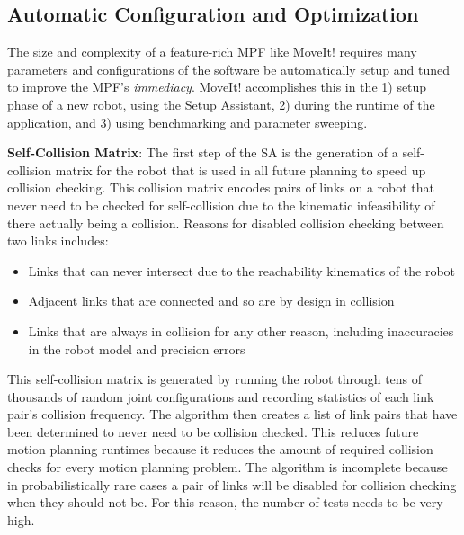 \documentclass[10pt,journal,compsoc]{joser1}
\begin{document}
{%
\subsection{Automatic Configuration and Optimization}

The size and complexity of a feature-rich MPF like MoveIt! requires many parameters and configurations of the software be automatically setup and tuned to improve the MPF's \textit{immediacy}. MoveIt! accomplishes this in the 1) setup phase of a new robot, using the Setup Assistant, 2) during the runtime of the application, and 3) using benchmarking and parameter sweeping\cite{cohen2012generic}.

{\bf Self-Collision Matrix}: The first step of the SA is the generation of a self-collision matrix for the robot that is used in all future planning to speed up collision checking. This collision matrix encodes pairs of links on a robot that never need to be checked for self-collision due to the kinematic infeasibility of there actually being a collision. Reasons for disabled collision checking between two links includes:
\begin{itemize}
    \item Links that can never intersect due to the reachability kinematics of the robot
    \item Adjacent links that are connected and so are by design in collision
    \item Links that are always in collision for any other reason, including inaccuracies in the robot model and precision errors
\end{itemize}

This self-collision matrix is generated by running the robot through tens of thousands of random joint configurations and recording statistics of each link pair's collision frequency. The algorithm then creates a list of link pairs that have been determined to never need to be collision checked. This reduces future motion planning runtimes because it reduces the amount of required collision checks for every motion planning problem. The algorithm is incomplete because in probabilistically rare cases a pair of links will be disabled for collision checking when they should not be. For this reason, the number of tests needs to be very high.

}
\end{document}

